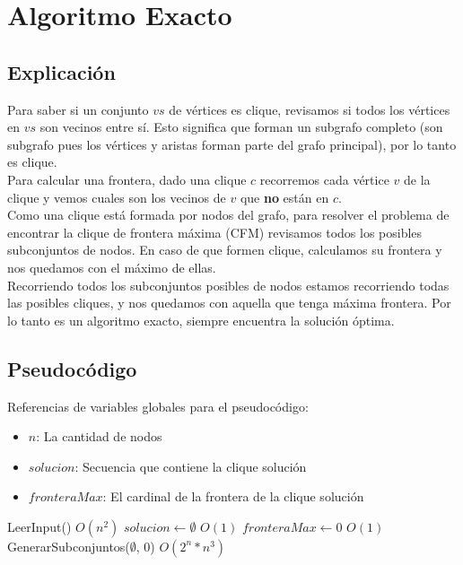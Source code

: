 
\section{Algoritmo Exacto}

\subsection{Explicación}
Para saber si un conjunto $vs$ de vértices es clique, revisamos si todos los vértices en $vs$ son vecinos entre sí.
Esto significa que forman un subgrafo completo (son subgrafo pues los vértices y aristas forman parte del grafo principal), por lo tanto es clique. \\

Para calcular una frontera, dado una clique $c$ recorremos cada vértice $v$ de la clique y vemos cuales son los vecinos de $v$ que \textbf{no} están en $c$. \\

Como una clique está formada por nodos del grafo, para resolver el problema de encontrar la clique de frontera máxima (CFM) revisamos todos los posibles subconjuntos de nodos. En caso de que formen clique, calculamos su frontera y nos quedamos con el máximo de ellas. \\

Recorriendo todos los subconjuntos posibles de nodos estamos recorriendo todas las posibles cliques, y nos quedamos con aquella que tenga máxima frontera. Por lo tanto es un algoritmo exacto, siempre encuentra la solución óptima. \\

\subsection{Pseudocódigo}

Referencias de variables globales para el pseudocódigo:
\begin{itemize}
    \item $n$: La cantidad de nodos
    \item $solucion$: Secuencia que contiene la clique solución
    \item $fronteraMax$: El cardinal de la frontera de la clique solución
\end{itemize}

\begin{algorithm}[H]
\begin{algorithmic}
    \State LeerInput()                  \Comment $O(n^2)$
    \State $solucion \gets \emptyset$   \Comment $O(1)$
    \State $fronteraMax \gets 0$        \Comment $O(1)$
    \State GenerarSubconjuntos($\emptyset$, $0$) \Comment $O(2^{n} * n^{3})$
\EndFunction
\end{algorithmic}
\end{algorithm}

